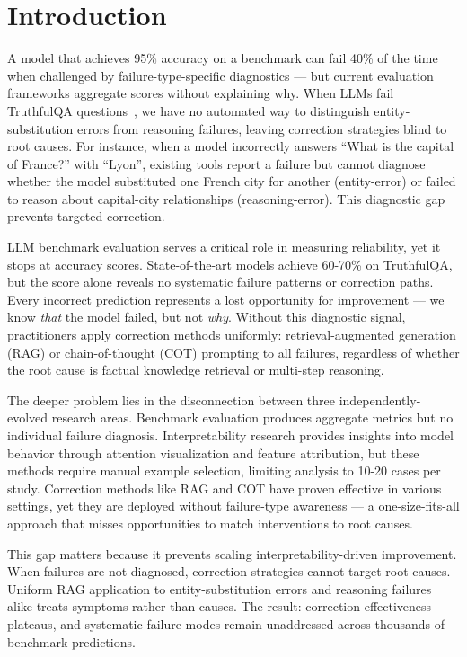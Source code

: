\section{Introduction}

A model that achieves 95\% accuracy on a benchmark can fail 40\% of the time when challenged by failure-type-specific diagnostics --- but current evaluation frameworks aggregate scores without explaining why. When LLMs fail TruthfulQA questions~\cite{Lin2021TruthfulQA}, we have no automated way to distinguish entity-substitution errors from reasoning failures, leaving correction strategies blind to root causes. For instance, when a model incorrectly answers ``What is the capital of France?'' with ``Lyon'', existing tools report a failure but cannot diagnose whether the model substituted one French city for another (entity-error) or failed to reason about capital-city relationships (reasoning-error). This diagnostic gap prevents targeted correction.

LLM benchmark evaluation serves a critical role in measuring reliability, yet it stops at accuracy scores. State-of-the-art models achieve 60-70\% on TruthfulQA, but the score alone reveals no systematic failure patterns or correction paths. Every incorrect prediction represents a lost opportunity for improvement --- we know \textit{that} the model failed, but not \textit{why}. Without this diagnostic signal, practitioners apply correction methods uniformly: retrieval-augmented generation (RAG) or chain-of-thought (COT) prompting to all failures, regardless of whether the root cause is factual knowledge retrieval or multi-step reasoning.

The deeper problem lies in the disconnection between three independently-evolved research areas. Benchmark evaluation produces aggregate metrics but no individual failure diagnosis. Interpretability research provides insights into model behavior through attention visualization and feature attribution, but these methods require manual example selection, limiting analysis to 10-20 cases per study. Correction methods like RAG and COT have proven effective in various settings, yet they are deployed without failure-type awareness --- a one-size-fits-all approach that misses opportunities to match interventions to root causes.

This gap matters because it prevents scaling interpretability-driven improvement. When failures are not diagnosed, correction strategies cannot target root causes. Uniform RAG application to entity-substitution errors and reasoning failures alike treats symptoms rather than causes. The result: correction effectiveness plateaus, and systematic failure modes remain unaddressed across thousands of benchmark predictions.

